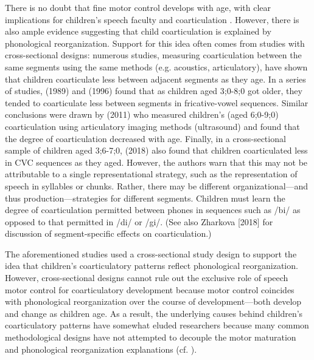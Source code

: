 \documentclass[a4paper,man,natbib,donotrepeattitle, apacite]{apa6}
\begin{document}
There is no doubt that fine motor control develops with age, with clear implications for children’s speech faculty and coarticulation \cite{barbierWhatAnticipatoryCoarticulation2020,zharkovaDynamicsVoicelessSibilant2018}. However, there is also ample evidence suggesting that child coarticulation is explained by phonological reorganization. Support for this idea often comes from studies with cross-sectional designs: numerous studies, measuring coarticulation between the same segments using the same methods (e.g. acoustics, articulatory), have shown that children coarticulate less between adjacent segments as they age. 
In a series of studies, \citeauthor{nittrouerEmergencePhoneticSegments1989} (1989) and \citeauthor{nittrouerHowChildrenLearn1996} (1996) found that as children aged 3;0-8;0 got older, they tended to coarticulate less between segments in fricative-vowel sequences. Similar conclusions were drawn by \citeauthor{zharkovaCoarticulationIndicatorSpeech2011} (2011) who measured children’s (aged 6;0-9;0) coarticulation using articulatory imaging methods (ultrasound) and found that the degree of coarticulation decreased with age. Finally, in a cross-sectional sample of children aged 3;6-7;0, \citeauthor{noirayHowChildrenOrganize2018} (2018) also found that children coarticulated less in CVC sequences as they aged. However, the authors warn that this may not be attributable to a single representational strategy, such as the representation of speech in syllables or chunks. Rather, there may be different organizational---and thus production---strategies for different segments. Children must learn the degree of coarticulation permitted between phones in sequences such as /bi/ as opposed to that permitted in /di/ or /gi/. (See also Zharkova [2018] for discussion of segment-specific effects on coarticulation.) 

The aforementioned studies used a cross-sectional study design to support the idea that children’s coarticulatory patterns reflect phonological reorganization. However, cross-sectional designs cannot rule out the exclusive role of speech motor control for coarticulatory development because motor control coincides with phonological reorganization over the course of development---both develop and change as children age. As a result, the underlying causes behind children’s coarticulatory patterns have somewhat eluded researchers because many common methodological designs have not attempted to decouple the motor maturation and phonological reorganization explanations (cf. ).
\end{document}
